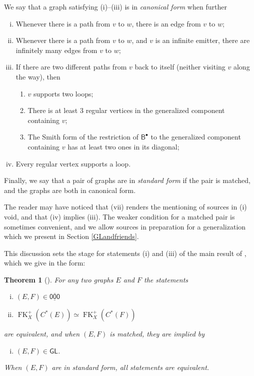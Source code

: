 \documentclass[12pt]{amsbook}%
\newcommand{\BB}{\mathsf B}
\newtheorem{theor}{Theorem}[section]
\theoremstyle{defin}
\theoremstyle{remark}
\numberwithin{equation}{chapter}
\numberwithin{theor}{section}
\newcommand{\xyzrel}[1]{\mbox{$\overline{\underline{\mathsf{ #1}}}$}}
\newcommand{\GLrel}{\mathsf{GL}}
\newcommand{\FKXp}{\operatorname{FK}_X^+}
\begin{document}
We say that a graph satisfying (i)--(iii) is in \emph{canonical form} when further
\begin{enumerate}[(i)]\addtocounter{enumi}{3}
\item Whenever there is a path from $v$ to $w$, there is an edge from $v$ to $w$;
\item Whenever there is a path from $v$ to $w$, and $v$ is an infinite emitter, there are infinitely many edges from $v$ to $w$;
\item 
If there are two different paths from $v$ back to itself (neither visiting $v$ along the way), then 
\begin{enumerate}
\item  $v$ supports  two loops;
\item There is at least 3 regular vertices in the generalized component containing $v$; 
 \item The Smith form of the restriction of $\BB^\bullet$ to the generalized component containing $v$ has at least two ones in its diagonal;
\end{enumerate} 
\item 
Every regular vertex supports a loop.
\end{enumerate}
Finally, we say that a pair of graphs are in \emph{standard form} if the pair is matched, and the graphs are both in canonical form.

The reader may have noticed that (vii) renders the mentioning of sources in (i) void, and that (iv) implies (iii). The weaker condition for a matched pair is sometimes convenient, and we allow sources in preparation for a generalization which we present in Section \ref{GLandfriends}.

This discussion sets the stage for statements (i) and (iii) of the main result of \cite{segrerapws:ccuggs}, which we give in the form:

\begin{theor}[{\cite[Theorems 3.1, 14.2]{segrerapws:ccuggs}}]\label{ERRSmain}
For any two graphs $E$ and $F$ the statements
\begin{enumerate}[(i)]
\item $(E,F)\in \xyzrel{000}$
\item $\FKXp(C^*(E))\simeq \FKXp(C^*(F))$
\end{enumerate}
are equivalent, and when $(E,F)$ is matched, they are implied by
\begin{enumerate}[(i)]\addtocounter{enumi}{2}
\item $(E,F)\in \GLrel$.
\end{enumerate}
When $(E,F)$ are in standard form, all statements are equivalent.
\end{theor}
\end{document}

